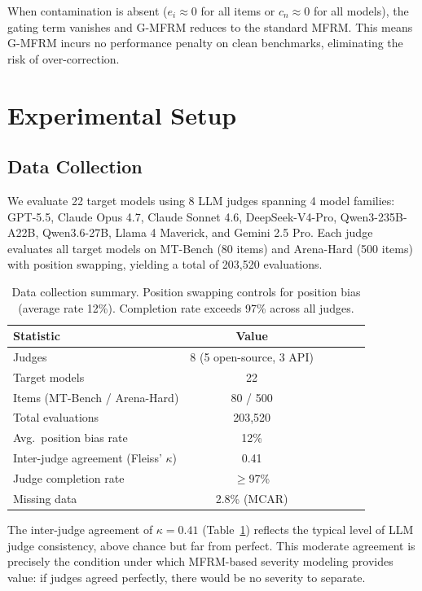 \documentclass[11pt]{article}
\begin{document}
When contamination is absent ($e_i \approx 0$ for all items or $c_n \approx 0$ for all models), the gating term vanishes and G-MFRM reduces to the standard MFRM. This means G-MFRM incurs no performance penalty on clean benchmarks, eliminating the risk of over-correction.

\section{Experimental Setup}
\label{sec:setup}

\subsection{Data Collection}

We evaluate 22 target models using 8 LLM judges spanning 4 model families: GPT-5.5, Claude Opus 4.7, Claude Sonnet 4.6, DeepSeek-V4-Pro, Qwen3-235B-A22B, Qwen3.6-27B, Llama 4 Maverick, and Gemini 2.5 Pro. Each judge evaluates all target models on MT-Bench (80 items) and Arena-Hard (500 items) with position swapping, yielding a total of 203,520 evaluations.

\begin{table}[t]
\centering
\caption{Data collection summary. Position swapping controls for position bias (average rate 12\%). Completion rate exceeds 97\% across all judges.}
\label{tab:data}
\begin{tabular}{lccccc}
\toprule
Statistic & Value \\
\midrule
Judges & 8 (5 open-source, 3 API) \\
Target models & 22 \\
Items (MT-Bench / Arena-Hard) & 80 / 500 \\
Total evaluations & 203,520 \\
Avg.\ position bias rate & 12\% \\
Inter-judge agreement (Fleiss' $\kappa$) & 0.41 \\
Judge completion rate & $\geq$97\% \\
Missing data & 2.8\% (MCAR) \\
\bottomrule
\end{tabular}
\end{table}

The inter-judge agreement of $\kappa = 0.41$ (Table~\ref{tab:data}) reflects the typical level of LLM judge consistency, above chance but far from perfect. This moderate agreement is precisely the condition under which MFRM-based severity modeling provides value: if judges agreed perfectly, there would be no severity to separate.
\end{document}

